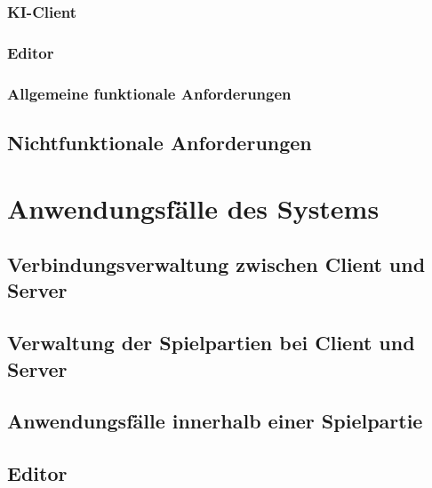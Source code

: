 \documentclass{uulm-assignment}
\begin{document}
\clearpage
\subsubsection{KI-Client}

\subsubsection{Editor}


\clearpage
\subsubsection{Allgemeine funktionale Anforderungen}


\clearpage
\subsection{Nichtfunktionale Anforderungen}


\clearpage
{}
\section{Anwendungsfälle des Systems}
\subsection{Verbindungsverwaltung zwischen Client und Server}


\subsection{Verwaltung der Spielpartien bei Client und Server}


\subsection{Anwendungsfälle innerhalb einer Spielpartie}


\subsection{Editor}

\end{document}
